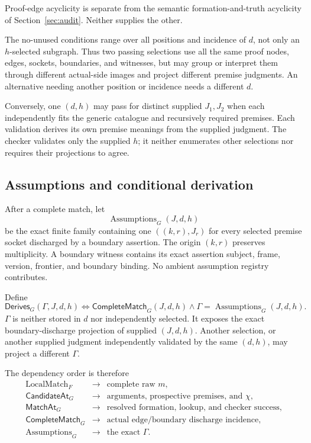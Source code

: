 \documentclass[11pt,twoside]{article}
\newcommand{\Derives}{\mathsf{Derives}}
\newcommand{\CandidateAt}{\mathsf{CandidateAt}}
\newcommand{\MatchAt}{\mathsf{MatchAt}}
\newcommand{\CompleteMatch}{\mathsf{CompleteMatch}}
\begin{document}
Proof-edge acyclicity is separate from the semantic formation-and-truth acyclicity
of Section~\ref{sec:audit}.  Neither supplies the other.

The no-unused conditions range over all positions and incidence of \(d\), not only
an \(h\)-selected subgraph.  Thus two passing selections use all the same proof
nodes, edges, sockets, boundaries, and witnesses, but may group or interpret them
through different actual-side images and project different premise judgments.
An alternative needing another position or incidence needs a different \(d\).

Conversely, one \((d,h)\) may pass for distinct supplied \(J_1,J_2\) when each
independently fits the generic catalogue and recursively required premises.  Each
validation derives its own premise meanings from the supplied judgment.  The
checker validates only the supplied \(h\); it neither enumerates other selections
nor requires their projections to agree.

\subsection{Assumptions and conditional derivation}

After a complete match, let
\[
  \operatorname{Assumptions}_G(J,d,h)
\]
be the exact finite family containing one
\(((k,r),J_r)\) for every selected premise socket discharged by a boundary
assertion.  The origin \((k,r)\) preserves multiplicity.  A boundary witness
contains its exact assertion subject, frame, version, frontier, and boundary
binding.  No ambient assumption registry contributes.

Define
\[
  \Derives_G(\Gamma,J,d,h)
  \Longleftrightarrow
  \CompleteMatch_G(J,d,h)
  \land
  \Gamma=\operatorname{Assumptions}_G(J,d,h).
\]
\(\Gamma\) is neither stored in \(d\) nor independently selected.  It exposes the
exact boundary-discharge projection of supplied \((J,d,h)\).  Another selection,
or another supplied judgment independently validated by the same \((d,h)\), may
project a different \(\Gamma\).

The dependency order is therefore
\[
\begin{array}{rcl}
\operatorname{LocalMatch}_F
 &\longrightarrow& \text{complete raw }m,\\
\CandidateAt_G
 &\longrightarrow& \text{arguments, prospective premises, and }\chi,\\
\MatchAt_G
 &\longrightarrow& \text{resolved formation, lookup, and checker success},\\
\CompleteMatch_G
 &\longrightarrow& \text{actual edge/boundary discharge incidence},\\
\operatorname{Assumptions}_G
 &\longrightarrow& \text{the exact }\Gamma.
\end{array}
\]
\end{document}
